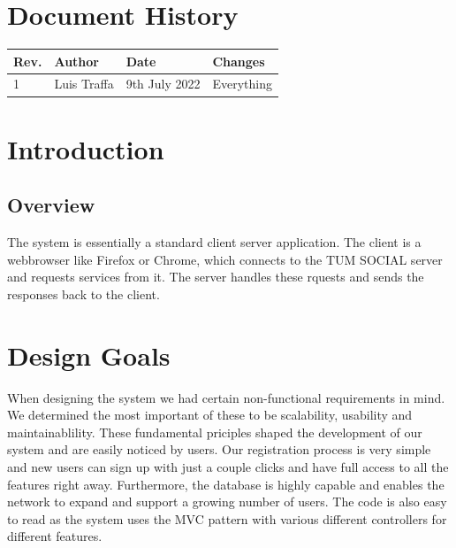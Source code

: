 \documentclass[a4paper,12pt]{scrartcl}
\begin{document}
    \renewcommand{\contentsname}{Table of Contents}
    \tableofcontents
    \section*{Document History}

    \begin{tabular}{
        |p{}%
        |p{}%
        |p{}
        |p{}|%
    }
        \hline
        Rev. & Author & Date            & Changes          \\
        \hline
        1    & Luis Traffa  & 9th July 2022 & Everything \\
       
        \hline
    \end{tabular}
    \newpage
    \sectionfont{\color[HTML]{355a8a}}  %
    \subsectionfont{\color[HTML]{4e81bc}}


    \section{Introduction}
    
    \subsection{Overview}
        
    The system is essentially a standard client server application. The client is a webbrowser like Firefox or Chrome, which connects to the TUM SOCIAL server and requests services from it.
    The server handles these rquests and sends the responses back to the client. 

     


    \section{Design Goals}
    
    When designing the system we had certain non-functional requirements in mind. We determined the most important of these to be scalability, usability and maintainablility. These fundamental priciples shaped the development of our system and are easily noticed by users. Our registration process is very simple and new users can sign up with just a couple clicks and have full access to all the features right away. Furthermore, the database is highly capable and enables the network to expand and support a growing number of users. The code is also easy to read as the system uses the MVC pattern with various different controllers for different features.
\end{document}
